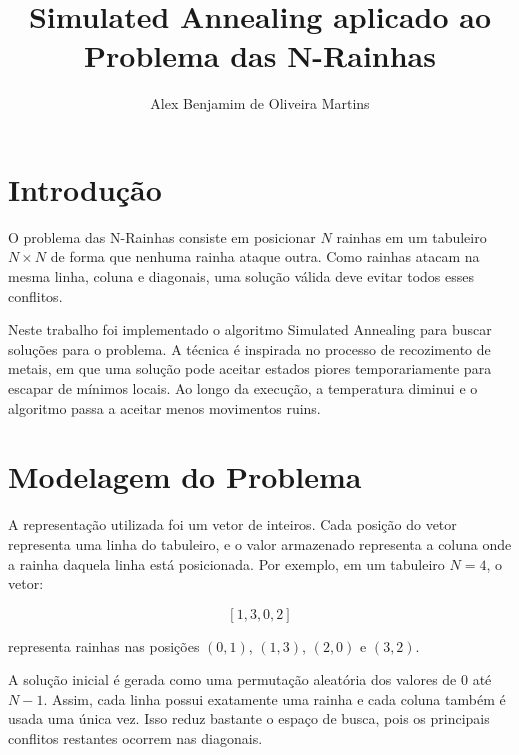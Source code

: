 \documentclass[12pt,a4paper]{article}
\title{Simulated Annealing aplicado ao Problema das N-Rainhas}
\author{Alex Benjamim de Oliveira Martins}
\date{}
\begin{document}
\maketitle

\section{Introdução}

O problema das N-Rainhas consiste em posicionar $N$ rainhas em um tabuleiro $N \times N$ de forma que nenhuma rainha ataque outra. Como rainhas atacam na mesma linha, coluna e diagonais, uma solução válida deve evitar todos esses conflitos.

Neste trabalho foi implementado o algoritmo Simulated Annealing para buscar soluções para o problema. A técnica é inspirada no processo de recozimento de metais, em que uma solução pode aceitar estados piores temporariamente para escapar de mínimos locais. Ao longo da execução, a temperatura diminui e o algoritmo passa a aceitar menos movimentos ruins.

\section{Modelagem do Problema}

A representação utilizada foi um vetor de inteiros. Cada posição do vetor representa uma linha do tabuleiro, e o valor armazenado representa a coluna onde a rainha daquela linha está posicionada. Por exemplo, em um tabuleiro $N = 4$, o vetor:

\[
[1, 3, 0, 2]
\]

representa rainhas nas posições $(0,1)$, $(1,3)$, $(2,0)$ e $(3,2)$.

A solução inicial é gerada como uma permutação aleatória dos valores de $0$ até $N-1$. Assim, cada linha possui exatamente uma rainha e cada coluna também é usada uma única vez. Isso reduz bastante o espaço de busca, pois os principais conflitos restantes ocorrem nas diagonais.
\end{document}
